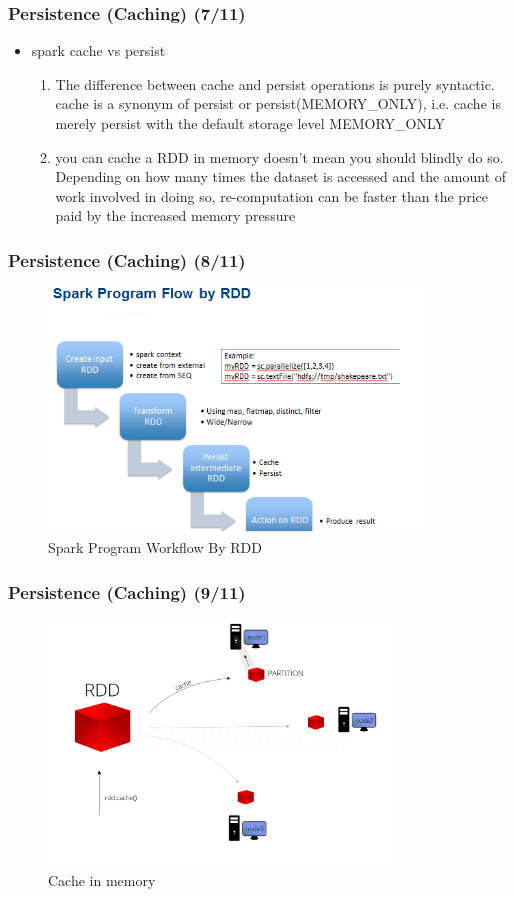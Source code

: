 \begin{frame}
	\frametitle{Persistence (Caching) (7/11)}
	\begin{itemize}[<+->]
		\item spark cache vs persist
		\begin{enumerate}
			\item The difference between cache and persist operations is purely syntactic. cache is a synonym of persist or persist(MEMORY\_ONLY), i.e. cache is merely persist with the default storage level MEMORY\_ONLY
			\item you can cache a RDD in memory doesn’t mean you should blindly do so. Depending on how many times the dataset is accessed and the amount of work involved in doing so, re-computation can be faster than the price paid by the increased memory pressure
		\end{enumerate}
		
	\end{itemize}
\end{frame}

\begin{frame}
	\frametitle{Persistence (Caching) (8/11)}
	  \begin{figure}
			\caption{Spark Program Workflow By RDD}  		  	
			\includegraphics[width=\textwidth,height=6.5cm]{Graphics/SparkWF.PNG}
		\end{figure}
		
\end{frame}


\begin{frame}
	\frametitle{Persistence (Caching) (9/11)}
		\begin{figure}
			\caption{Cache in memory}  		  	
			\includegraphics[width=\textwidth,height=6.5cm]{Graphics/cache.png}
		\end{figure}
\end{frame}


